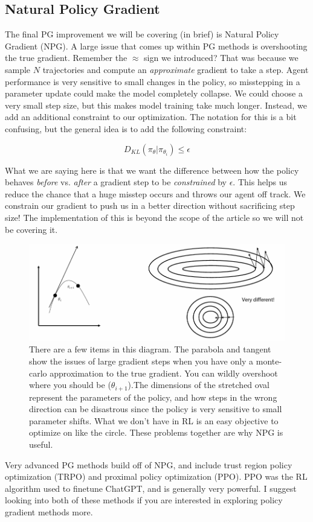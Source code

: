\subsection{Natural Policy Gradient}
    \begin{flushleft}
    \large The final PG improvement we will be covering (in brief) is Natural Policy Gradient (NPG). A large issue that comes up within PG methods is overshooting the true gradient. Remember the $\approx$ sign we introduced? That was because we sample $N$ trajectories and compute an \textit{approximate} gradient to take a step. Agent performance is very sensitive to small changes in the policy, so misstepping in a parameter update could make the model completely collapse. We could choose a very small step size, but this makes model training take much longer. Instead, we add an additional constraint to our optimization. The notation for this is a bit confusing, but the general idea is to add the following constraint:

    $$D_{KL}(\pi_\theta|\pi_{\theta_i}) \leq \epsilon$$

    What we are saying here is that we want the difference between how the policy behaves \textit{before} vs. \textit{after} a gradient step to be \textit{constrained} by $\epsilon$. This helps us reduce the chance that a huge misstep occurs and throws our agent off track. We constrain our gradient to push us in a better direction without sacrificing step size! The implementation of this is beyond the scope of the article so we will not be covering it. \break

    \begin{figure}[H]
        \centering
        \includegraphics[width=0.9\linewidth]{rl/npg.png}
        \caption{There are a few items in this diagram. The parabola and tangent show the issues of large gradient steps when you have only a monte-carlo approximation to the true gradient. You can wildly overshoot where you should be ($\theta_{i+1}$).The dimensions of the stretched oval represent the parameters of the policy, and how steps in the wrong direction can be disastrous since the policy is very sensitive to small parameter shifts. What we don't have in RL is an easy objective to optimize on like the circle. These problems together are why NPG is useful.}
        \label{fig:npg}
    \end{figure}

    Very advanced PG methods build off of NPG, and include trust region policy optimization (TRPO) and proximal policy optimization (PPO). PPO was the RL algorithm used to finetune ChatGPT, and is generally very powerful. I suggest looking into both of these methods if you are interested in exploring policy gradient methods more.
\end{flushleft}

